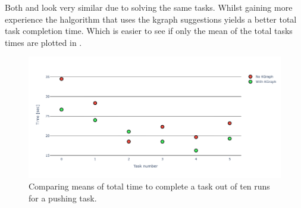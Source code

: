Both  and  look very similar due to solving the same tasks. Whilst gaining more experience the \ac{halgorithm} that uses the \ac{kgraph} suggestions yields a better total task completion time. Which is easier to see if only the mean of the total tasks times are plotted in . 

\begin{figure}[H]
    \centering
    \includegraphics[width=\textwidth]{figures/results/random_push_time_vs}
    \caption{Comparing means of total time to complete a task out of ten runs for a pushing task.}\label{fig:random_push_time_vs}
\end{figure}


